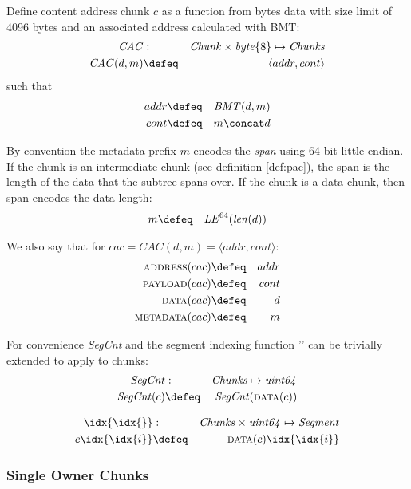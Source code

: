 \begin{definition}
\label{def:cac}
Define content address chunk $c$ as a function from bytes data with size limit of 4096 bytes and an associated address calculated with BMT:
% 
\begin{eqnarray}
\mathit{CAC} &:& \mathit{Chunk}\times\mathit{byte}\{8\}\mapsto\mathit{Chunks}\\
\mathit{CAC}(d,m)&\defeq&\langle addr,cont\rangle
\end{eqnarray}
%
such that
%
\begin{eqnarray}
addr&\defeq&\mathit{BMT}(d,m)\\
cont&\defeq&m\concat d
\end{eqnarray}


By convention the metadata prefix $m$ encodes the \emph{span} using 64-bit little endian. If the chunk is an intermediate chunk (see definition \ref{def:pac}), the span is the length of the data that the subtree spans over. If the chunk is a data chunk, then span encodes the data length:
%
\begin{eqnarray}
m&\defeq& \mathit{LE}^{64}(\mathit{len}(d))
\end{eqnarray}

We also say that for $cac = \mathit{CAC}(d,m) = \langle addr,cont\rangle$:
%
\begin{eqnarray}
\textsc{address}(cac)&\defeq&addr\\
\textsc{payload}(cac)&\defeq&cont\\
\textsc{data}(cac)&\defeq& d\\
\textsc{metadata}(cac)&\defeq& m
\end{eqnarray}

For convenience \emph{SegCnt} and the segment indexing function '\idx{\idx{}}' can be trivially extended to apply to chunks:
%
\begin{eqnarray}
\mathit{SegCnt}&:&\mathit{Chunks}\mapsto\mathit{uint64}\\
\mathit{SegCnt}(c)&\defeq&\mathit{SegCnt}(\textsc{data}(c))
\end{eqnarray}

\begin{eqnarray}
\idx{\idx{}}&:&\mathit{Chunks}\times\mathit{uint64}\mapsto\mathit{Segment}\\
c\idx{\idx{i}}&\defeq&\textsc{data}(c)\idx{\idx{i}}
\end{eqnarray}
\end{definition}

\subsubsection{Single Owner Chunks}

